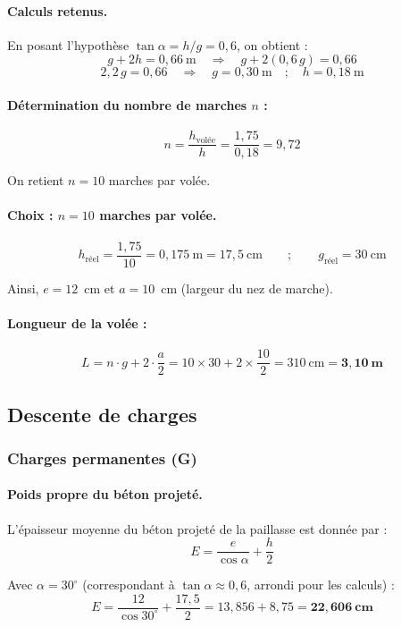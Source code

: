 \paragraph{Calculs retenus.} En posant l'hypothèse $\tan\alpha = h/g = 0{,}6$, on obtient :
\[
  g + 2h = 0{,}66~\text{m} \quad\Longrightarrow\quad g + 2(0{,}6\,g) = 0{,}66
\]
\[
  2{,}2\,g = 0{,}66 \quad\Longrightarrow\quad g = 0{,}30~\text{m} \quad ; \quad h = 0{,}18~\text{m}
\]

\paragraph{Détermination du nombre de marches $n$ :}
\[
  n = \frac{h_\text{volée}}{h} = \frac{1{,}75}{0{,}18} = 9{,}72
\]

On retient $n = 10$ marches par volée.

\paragraph{Choix : $n = 10$ marches par volée.}
\[
  h_\text{réel} = \frac{1{,}75}{10} = 0{,}175~\text{m} = 17{,}5~\text{cm}
  \qquad ; \qquad
  g_\text{réel} = 30~\text{cm}
\]

Ainsi, $e = 12$~cm et $a = 10$~cm (largeur du nez de marche).

\paragraph{Longueur de la volée :}
\[
  L = n \cdot g + 2 \cdot \frac{a}{2}
    = 10 \times 30 + 2 \times \frac{10}{2}
    = 310~\text{cm}
    = \mathbf{3{,}10~\text{m}}
\]

\subsection{Descente de charges}

\subsubsection{Charges permanentes (G)}

\paragraph{Poids propre du béton projeté.} L'épaisseur moyenne du béton projeté de la paillasse est donnée par :
\[
  E = \frac{e}{\cos\alpha} + \frac{h}{2}
\]

Avec $\alpha = 30^\circ$ (correspondant à $\tan\alpha \approx 0{,}6$, arrondi pour les calculs) :
\[
  E = \frac{12}{\cos 30^\circ} + \frac{17{,}5}{2}
    = 13{,}856 + 8{,}75
    = \mathbf{22{,}606~\text{cm}}
\]

